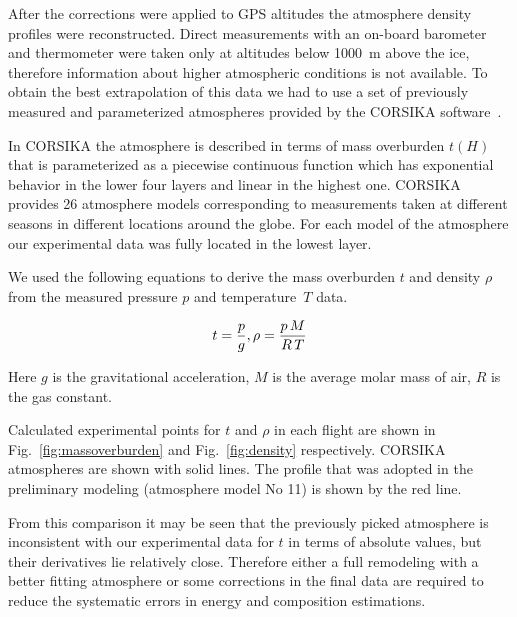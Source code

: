 \documentclass[final,5p,times,twocolumn]{elsarticle}
\begin{document}

After the corrections were applied to GPS altitudes the atmosphere density profiles were reconstructed. Direct measurements with an on-board barometer and thermometer were taken only at altitudes below 1000~m above the ice, therefore information about higher atmospheric conditions is not available. To obtain the best extrapolation of this data we had to use a set of previously measured and parameterized atmospheres provided by the CORSIKA software~\cite{hec98}.

In CORSIKA the atmosphere is described in terms of mass overburden $t(H)$ that is parameterized as a piecewise continuous function which has exponential behavior in the lower four layers and linear in the highest one. %
CORSIKA provides 26 atmosphere models corresponding to measurements taken at different seasons in different locations around the globe. For each model of the atmosphere our experimental data was fully located in the lowest layer.

We used the following equations to derive the mass overburden $t$ and density $\rho$ from the measured pressure $p$ and temperature~$T$ data.

\begin{equation}
t     = \frac{p}{g}, \\
\rho  = \frac{p \, M}{R \, T} \\
\end{equation}

Here $g$ is the gravitational acceleration, $M$ is the average molar mass of air, $R$ is the gas constant.

Calculated experimental points for $t$ and $\rho$ in each flight are shown in Fig.~\ref{fig:massoverburden} and Fig.~\ref{fig:density} respectively. CORSIKA atmospheres are shown with solid lines. The profile that was adopted in the preliminary modeling (atmosphere model No 11) is shown by the red line.

From this comparison it may be seen that the previously picked atmosphere is inconsistent with our experimental data for $t$ in terms of absolute values, but their derivatives lie relatively close. Therefore either a full remodeling with a better fitting atmosphere or some corrections in the final data are required to reduce the systematic errors in energy and composition estimations.
\end{document}
